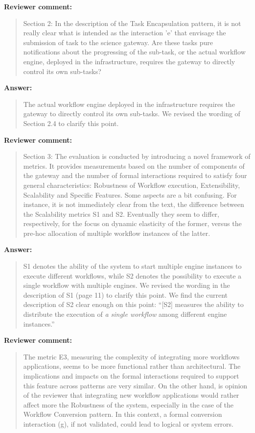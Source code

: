 \documentclass[a4]{article}
\newenvironment{review}%
{\textbf{Reviewer comment:}\begin{quote}}%
{\end{quote}}%
\newenvironment{answer}%
{\textbf{Answer:}\begin{small}\begin{quote}}%
{\end{quote}\end{small}}%
\begin{document}
\begin{review}
  Section 2: In the description of the Task Encapsulation pattern, it
  is not really clear what is intended as the interaction 'e' that
  envisage the submission of task to the science gateway. Are these
  tasks pure notifications about the progressing of the sub-task, or
  the actual workflow engine, deployed in the infrastructure, requires
  the gateway to directly control its own sub-tasks?
\end{review}

\begin{answer}
  The actual workflow engine deployed in the infrastructure
  requires the gateway to directly control its own sub-tasks. We
  revised the wording of Section 2.4 to clarify this point.
\end{answer}

\begin{review}
  Section 3: The evaluation is conducted by introducing a novel
  framework of metrics. It provides measurements based on the number
  of components of the gateway and the number of formal interactions
  required to satisfy four general characteristics: Robustness of
  Workflow execution, Extensibility, Scalability and Specific
  Features. Some aspects are a bit confusing. For instance, it is not
  immediately clear from the text, the difference between the
  Scalability metrics S1 and S2. Eventually they seem to differ,
  respectively, for the focus on dynamic elasticity of the former,
  versus the pre-hoc allocation of multiple workflow instances of the
  latter.
\end{review}

\begin{answer}
  S1 denotes the ability of the system to start multiple engine
  instances to execute different workflows, while S2 denotes the
  possibility to execute a single workflow with multiple engines. We
  revised the wording in the description of S1 (page 11) to clarify
  this point. We find the current description of S2 clear enough on
  this point: ``[S2] measures the ability to distribute the execution of
  \emph{a single workflow} among different engine instances.''
\end{answer}

\begin{review}
The metric E3, measuring the complexity of integrating more workflows applications, seems to be more functional rather than architectural. The implications and impacts on the formal interactions required to support this feature across patterns are very similar.
 On the other hand, is opinion of the reviewer that integrating new workflow applications would rather affect more the Robustness of the system, especially in the case of the Workflow Conversion pattern. In this context, a formal conversion interaction (g), if not validated, could lead to logical or system errors.
\end{review}
\end{document}
